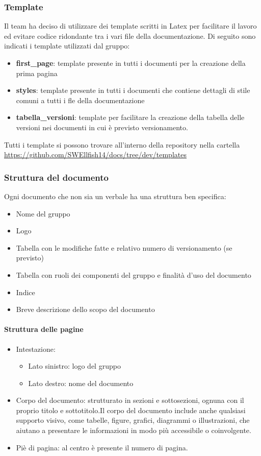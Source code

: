 \documentclass[12pt]{article}
\begin{document}
\subsubsection{Template}
Il team ha deciso di utilizzare dei template scritti in Latex per facilitare il lavoro ed evitare codice ridondante tra i vari file della documentazione.
Di seguito sono indicati i template utilizzati dal gruppo:
\begin{itemize}
    \item \textbf{first\_page}: template presente in tutti i documenti per la creazione della prima pagina
    \item \textbf{styles}: template presente in tutti i documenti che contiene dettagli di stile comuni a tutti i fle della documentazione
    \item \textbf{tabella\_versioni}: template per facilitare la creazione della tabella delle versioni nei documenti in cui è previsto versionamento.
    
\end{itemize}
Tutti i template si possono trovare all'interno della repository nella cartella \url{https://github.com/SWEllfish14/docs/tree/dev/templates}

\subsubsection{Struttura del documento}
Ogni documento che non sia un verbale ha una struttura ben specifica:
\begin{itemize}
    \item Nome del gruppo
    \item Logo 
    \item Tabella con le modifiche fatte e relativo numero di versionamento (se previsto)
    \item Tabella con ruoli dei componenti del gruppo e finalità d'uso del documento
    \item Indice
    \item Breve descrizione dello scopo del documento
\end{itemize}

\paragraph{Struttura delle pagine}
\begin{itemize}
	\item Intestazione:
		\begin{itemize}
			\item Lato sinistro: logo del gruppo
			\item Lato destro: nome del documento
		\end{itemize}
	\item Corpo del documento:  strutturato in sezioni e sottosezioni, ognuna con il proprio titolo e sottotitolo.Il corpo del documento include anche qualsiasi supporto visivo, come tabelle, figure, grafici, 	diagrammi o illustrazioni, che aiutano a presentare le informazioni in modo più accessibile o coinvolgente.
	\item Piè di pagina: al centro è presente il numero di pagina.
\end{itemize}
\end{document}
